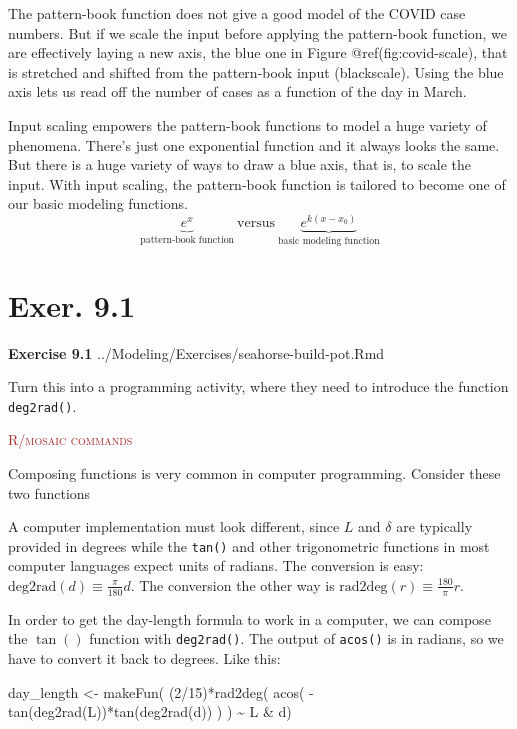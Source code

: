 \documentclass[
  letterpaper,
  DIV=11,
  numbers=noendperiod,
  oneside]{article}
\newenvironment{Shaded}{\begin{snugshade}}{\end{snugshade}}
\newcommand{\DecValTok}[1]{\textcolor[rgb]{0.68,0.00,0.00}{#1}}
\newcommand{\FunctionTok}[1]{\textcolor[rgb]{0.28,0.35,0.67}{#1}}
\newcommand{\NormalTok}[1]{\textcolor[rgb]{0.00,0.23,0.31}{#1}}
\newcommand{\OtherTok}[1]{\textcolor[rgb]{0.00,0.23,0.31}{#1}}
\newcommand{\SpecialCharTok}[1]{\textcolor[rgb]{0.37,0.37,0.37}{#1}}
\newenvironment{rmosaic}%
{%
\textcolor{brown}{\hrulefill}%
  \par\vspace{.3\baselineskip}%
  \textcolor{brown}{\scshape R/mosaic commands}%
  \par\vspace{\baselineskip}%
}%
{\textcolor{brown}{\hrulefill}}
\begin{document}
\begin{multicols}{2}
The pattern-book function does not give a good model of the COVID case
numbers. But if we scale the input before applying the pattern-book
function, we are effectively laying a new axis, the blue one in Figure
@ref(fig:covid-scale), that is stretched and shifted from the
pattern-book input (blackscale). Using the blue axis lets us read off
the number of cases as a function of the day in March.

Input scaling empowers the pattern-book functions to model a huge
variety of phenomena. There's just one exponential function and it
always looks the same. But there is a huge variety of ways to draw a
blue axis, that is, to scale the input. With input scaling, the
pattern-book function is tailored to become one of our basic modeling
functions.
\[\underbrace{e^x}_\text{pattern-book function}\  \text{versus}\  \underbrace{e^{k(x-x_0)}}_\text{basic modeling function}\]

\hypertarget{exer.-9.1}{%
\section*{Exer. 9.1}\label{exer.-9.1}}

\textbf{Exercise 9.1} ../Modeling/Exercises/seahorse-build-pot.Rmd

Turn this into a programming activity, where they need to introduce the
function \texttt{deg2rad()}.

\begin{rmosaic}
Composing functions is very common in computer programming. Consider
these two functions

\end{rmosaic}

A computer implementation must look different, since \(L\) and
\(\delta\) are typically provided in degrees while the \texttt{tan()}
and other trigonometric functions in most computer languages expect
units of radians. The conversion is easy:
\(\text{deg2rad}(d) \equiv \frac{\pi}{180} d\). The conversion the other
way is \(\text{rad2deg}(r) \equiv \frac{180}{\pi} r\).

In order to get the day-length formula to work in a computer, we can
compose the \(\tan()\) function with \texttt{deg2rad()}. The output of
\texttt{acos()} is in radians, so we have to convert it back to degrees.
Like this:

\begin{Shaded}
\begin{Highlighting}[]
\NormalTok{day\_length }\OtherTok{\textless{}{-}} \FunctionTok{makeFun}\NormalTok{(}
\NormalTok{  (}\DecValTok{2}\SpecialCharTok{/}\DecValTok{15}\NormalTok{)}\SpecialCharTok{*}\FunctionTok{rad2deg}\NormalTok{(}
    \FunctionTok{acos}\NormalTok{(}
      \SpecialCharTok{{-}}\FunctionTok{tan}\NormalTok{(}\FunctionTok{deg2rad}\NormalTok{(L))}\SpecialCharTok{*}\FunctionTok{tan}\NormalTok{(}\FunctionTok{deg2rad}\NormalTok{(d))}
\NormalTok{    )}
\NormalTok{  ) }\SpecialCharTok{\textasciitilde{}}\NormalTok{ L }\SpecialCharTok{\&}\NormalTok{ d)}
\end{Highlighting}
\end{Shaded}


\end{multicols}
\end{document}
